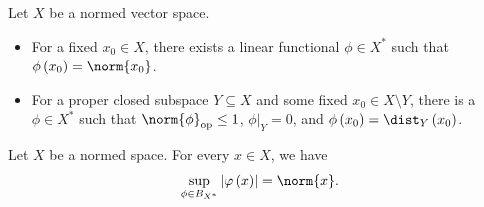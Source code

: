 \begin{theorem}\label{thm:hb_separation}
  Let $X$ be a normed vector space.
  \begin{itemize}
    \item For a fixed $x_0\in X$, there exists a linear functional $\phi\in X^{\ast}$ such that $\phi\left(x_0\right) = \norm{x_0}$.
    \item For a proper closed subspace $Y\subseteq X$ and some fixed $x_0\in X\setminus Y$, there is a $\phi\in X^{\ast}$ such that $\norm{\phi}_{\op} \leq 1$, $\phi|_{Y} = 0$, and $\phi\left(x_0\right) = \dist_{Y}\left(x_0\right)$.
  \end{itemize}
\end{theorem}
\begin{corollary}
  Let $X$ be a normed space. For every $x\in X$, we have
  \begin{align*}
    \sup_{\phi\in B_{X^{\ast}}}\left\vert \varphi\left(x\right)  \right\vert = \norm{x}.
  \end{align*}
\end{corollary}
